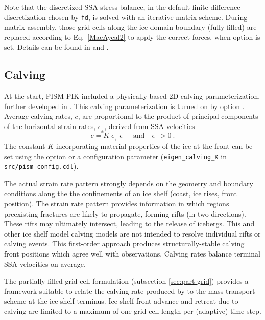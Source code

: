Note that the discretized SSA stress balance, in the default finite difference discretization chosen by  \texttt{fd}, is solved with an iterative matrix scheme. During matrix assembly, those grid cells along the ice domain boundary (fully-filled) are replaced according to Eq.~\eqref{MacAyeal2} to apply the correct forces, when option  is set.  Details can be found in \cite{Winkelmannetal2011} and \cite{Albrechtetal2011}.  

\subsection{Calving}
\label{sec:calving}
At the start, PISM-PIK included a physically based 2D-calving parameterization, further developed in \cite{LevermannAlbrecht11}. This calving parameterization is turned on by option .  Average calving rates, $c$, are proportional to the product of principal components of the horizontal strain rates, $\dot{\epsilon}_{_\pm}$, derived from SSA-velocities 
\begin{equation}
\label{eq: calv2}
c = K\; \dot{\epsilon}_{_+}\; \dot{\epsilon}_{_-}\quad\text{and}\quad\dot{\epsilon}_{_\pm}>0\:.
\end{equation}
The constant $K$ incorporating material properties of the ice at the front can be set using the  option or a configuration parameter (\texttt{eigen_calving_K} in \texttt{src/pism_config.cdl}).

The actual strain rate pattern strongly depends on the geometry and boundary conditions along the the confinements of an ice shelf (coast, ice rises, front position).  The strain rate pattern provides information in which regions preexisting fractures are likely to propagate, forming rifts (in two directions).  These rifts may ultimately intersect, leading to the release of icebergs. This and other ice shelf model calving models are not intended to resolve individual rifts or calving events. This first-order approach produces structurally-stable calving front positions which agree well with observations.  Calving rates balance terminal SSA velocities on average.

The partially-filled grid cell formulation (subsection \ref{sec:part-grid}) provides a framework suitable to relate the calving rate produced by  to the mass transport scheme at the ice shelf terminus.  Ice shelf front advance and retreat due to calving are limited to a maximum of one grid cell length per (adaptive) time step.

